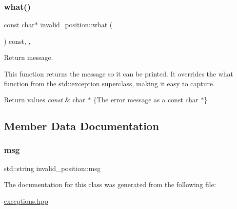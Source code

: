 \subsubsection{\texorpdfstring{what()}{what()}}
{\footnotesize\ttfamily const char$\ast$ invalid\+\_\+position\+::what (\begin{DoxyParamCaption}{ }\end{DoxyParamCaption}) const\hspace{0.3cm}{\ttfamily [inline]}, {\ttfamily [override]}, {\ttfamily [noexcept]}}



Return message. 

This function returns the message so it can be printed. It overrides the what function from the std\+::exception superclass, making it easy to capture.


\begin{DoxyRetVals}{Return values}
{\em const} & char $\ast$ \{The error message as a const char $\ast$\} \\
\hline
\end{DoxyRetVals}


\subsection{Member Data Documentation}
\mbox{\label{classinvalid__position_a53d057adf627ad9d7942a3233bca9028}} 
\subsubsection{\texorpdfstring{msg}{msg}}
{\footnotesize\ttfamily std\+::string invalid\+\_\+position\+::msg\hspace{0.3cm}{\ttfamily [private]}}



The documentation for this class was generated from the following file\+:\begin{DoxyCompactItemize}
\item 
\hyperlink{exceptions_8hpp}{exceptions.\+hpp}\end{DoxyCompactItemize}
